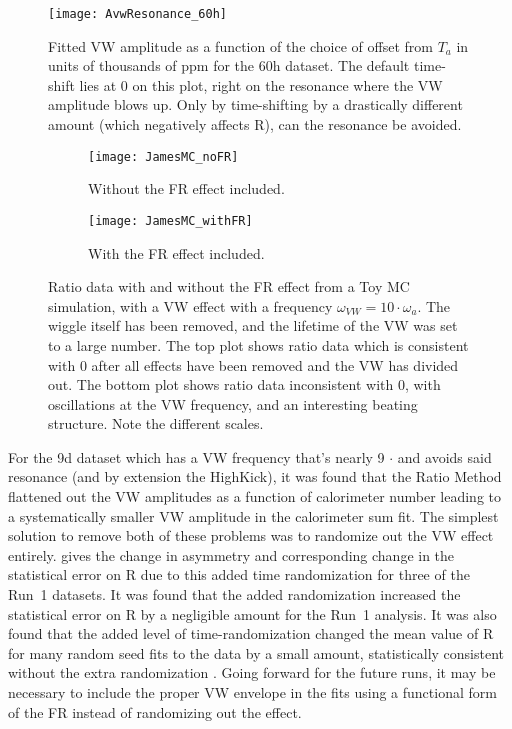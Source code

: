 \begin{figure}[]
    \centering
    \texttt{[image: AvwResonance\_60h]}
    \caption[VW amplitude resonance in the 60h dataset]{Fitted VW amplitude as a function of the choice of  offset from $T_{a}$ in units of thousands of ppm for the 60h dataset. The default time-shift lies at 0 on this plot, right on the resonance where the VW amplitude blows up. Only by time-shifting by a drastically different amount (which negatively affects R), can the resonance be avoided.}
    \label{fig:VWresonance}
\end{figure}


\begin{figure}[]
\centering
    \begin{subfigure}[t]{0.6\textwidth}
        \centering
        \texttt{[image: JamesMC\_noFR]}
        \caption{Without the FR effect included.}
    \end{subfigure}%

    \begin{subfigure}[t]{0.6\textwidth}
        \centering
        \texttt{[image: JamesMC\_withFR]}
        \caption{With the FR effect included.}
    \end{subfigure}
\caption[VW envelope in Ratio Method Toy MC data with and without FR effect]{Ratio data with and without the FR effect from a Toy MC simulation, with a VW effect with a frequency $\omega_{VW} = 10 \cdot \omega_{a}$. The \wa wiggle itself has been removed, and the lifetime of the VW was set to a large number. The top plot shows ratio data which is consistent with 0 after all effects have been removed and the VW has divided out. The bottom plot shows ratio data inconsistent with 0, with oscillations at the VW frequency, and an interesting beating structure. Note the different scales.}
\label{fig:JamesMC_VW_FR}
\end{figure}


For the 9d dataset which has a VW frequency that's nearly 9 $\cdot$ \wa and avoids said resonance (and by extension the HighKick), it was found that the Ratio Method flattened out the VW amplitudes as a function of calorimeter number leading to a systematically smaller VW amplitude in the calorimeter sum fit. The simplest solution to remove both of these problems was to randomize out the VW effect entirely.  gives the change in asymmetry and corresponding change in the statistical error on R due to this added time randomization for three of the Run~1 datasets. It was found that the added randomization increased the statistical error on R by a negligible amount for the Run~1 analysis. It was also found that the added level of time-randomization changed the mean value of R for many random seed fits to the data by a small amount, statistically consistent without the extra randomization \cite{VWinRatio}. Going forward for the future runs, it may be necessary to include the proper VW envelope in the fits using a functional form of the FR instead of randomizing out the effect.

